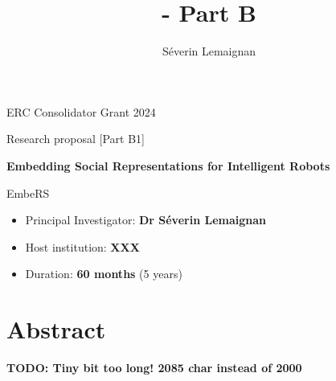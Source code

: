 \documentclass[11pt,a4paper]{report}
\title{\project - Part B}
\author{Séverin Lemaignan}
\newcommand{\project}{EmbeRS\xspace}
\newcommand{\TODO}[1]{{\color{red}\textbf{TODO: #1}}}
\newcommand{\eu}[1]{}
\begin{document}
\maketitle

\begin{center}
    ERC Consolidator Grant 2024

    Research proposal [Part B1]

    \vspace{2cm}

    \textbf{\LARGE Embedding Social Representations for Intelligent Robots}

    \vspace{2cm}
    {\Huge \project}

\end{center}

    \vspace{2cm}

\begin{itemize}
    \item Principal Investigator: \textbf{Dr Séverin Lemaignan}
    \item Host institution: \textbf{XXX}
    \item Duration: \textbf{60 months} (5 years)
\end{itemize}

\section*{Abstract}\label{abstract}

\eu{The abstract (summary) should, at a glance, provide the reader with a clear
understanding of the objectives of the research proposal and how they will be
achieved. The abstract will be used as the short description of your research
proposal in the evaluation process and in communications to contact in
particular the potential remote referees and/or inform the Commission and/or the
programme management committees and/or relevant national funding agencies
(provided you give permission to do so where requested in the online proposal
submission forms, section 1). It must therefore be short and precise and should
not contain confidential information. \\
Please use plain typed text, avoiding formulae and other special characters. The
abstract must be written in English. There is a limit of 2000 characters (spaces
and line breaks included).}

\TODO{Tiny bit too long! 2085 char instead of 2000}
\end{document}
